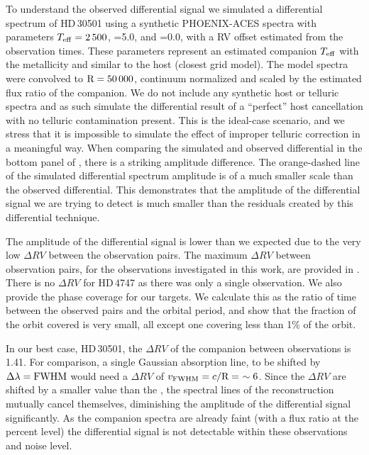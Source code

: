 To understand the observed differential signal we simulated a differential spectrum of {HD\,30501} using a synthetic {PHOENIX-ACES} spectra with parameters \(T_{\mathrm{eff}}{}=2\,500\)\K{}, \logg{}=5.0, and \feh{}=0.0, with a {RV} offset estimated from the observation times. These parameters represent an estimated companion \(T_{\mathrm{eff}}{}\) with the metallicity and \logg{} similar to the host (closest grid model). The model spectra were convolved to \(\textrm{R}=50\,000\), continuum normalized and scaled by the estimated flux ratio of the companion. We do not include any synthetic host or telluric spectra and as such simulate the differential result of a ``perfect'' host cancellation with no telluric contamination present. This is the ideal-case scenario, and we stress that it is impossible to simulate the effect of improper telluric correction in a meaningful way. When comparing the simulated and observed differential in the bottom panel of , there is a striking amplitude difference. The orange-dashed line of the simulated differential spectrum amplitude is of a much smaller scale than the observed differential. This demonstrates that the amplitude of the differential signal we are trying to detect is much smaller than the residuals created by this differential technique.

The amplitude of the differential signal is lower than we expected due to the very low \(\Delta {RV}\) between the observation pairs. The maximum \(\Delta {RV}\) between observation pairs, for the observations investigated in this work, are provided in . {\red{} There is no \(\Delta {RV}\) for {HD\,4747} as there was only a single observation. We also provide the phase coverage for our targets. We calculate this as the ratio of time between the observed pairs and the orbital period, and show that the fraction of the orbit covered is very small, all except one covering less than 1\% of the orbit.}

In our best case, {HD\,30501}, the \(\Delta {RV}\) of the companion between observations is 1.41\kmps{}. For comparison, a single Gaussian absorption line, to be shifted by \(\Delta\lambda = {\textrm{FWHM}}\) would need a \(\Delta {RV}\) of \(v_{\textrm{FWHM}} = c/\textrm{R} =~\sim6\)\kmps{}. Since the \(\Delta {RV}\) are shifted by a smaller value than the {\fwhm}, the spectral lines of the reconstruction mutually cancel themselves, diminishing the amplitude of the differential signal significantly. As the companion spectra are already faint (with a flux ratio at the percent level) the differential signal is not detectable within these observations and noise level.

